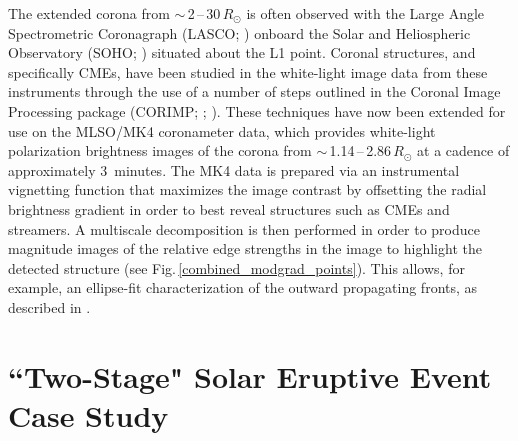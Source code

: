 \documentclass[namedreferences]{solarphysics}
\begin{document}
\begin{article}
The extended corona from $\sim$\,2\,--\,30\,$R_{\odot}$ is often observed with the Large Angle Spectrometric Coronagraph (LASCO; )  onboard the Solar and Heliospheric Observatory (SOHO; ) situated about the L1 point. Coronal structures, and specifically CMEs, have been studied in the white-light image data from these instruments through the use of a number of steps outlined in the Coronal Image Processing package (CORIMP; ; ). These techniques have now been extended for use on the MLSO/MK4 coronameter data, which provides white-light polarization brightness images of the corona from $\sim$\,1.14\,--\,2.86\,$R_{\odot}$ at a cadence of approximately 3~minutes. The MK4 data is prepared via an instrumental vignetting function that maximizes the image contrast by offsetting the radial brightness gradient in order to best reveal structures such as CMEs and streamers. A multiscale decomposition is then performed in order to produce magnitude images of the relative edge strengths in the image to highlight the detected structure (see Fig.\,\ref{combined_modgrad_points}). This allows, for example, an ellipse-fit characterization of the outward propagating fronts, as described in .



\section{``Two-Stage" Solar Eruptive Event Case Study}
\label{sect:event}


\end{article}
\end{document}
